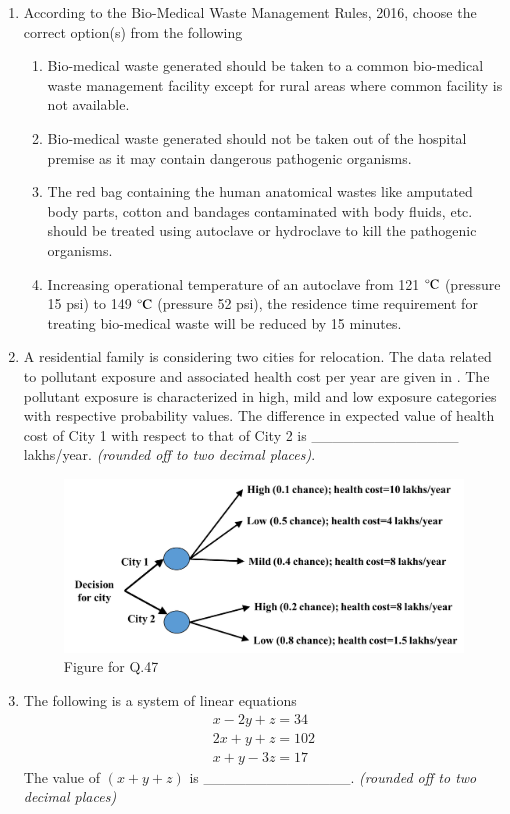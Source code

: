 \documentclass[journal]{IEEEtran}
\begin{document}
\begin{enumerate}[resume]
\item According to the Bio-Medical Waste Management Rules, 2016, choose the correct option(s) from the following
\hfill{}
\begin{enumerate}
\item Bio-medical waste generated should be taken to a common bio-medical waste management facility except for rural areas where common facility is not available.
\item Bio-medical waste generated should not be taken out of the hospital premise as it may contain dangerous pathogenic organisms.
\item The red bag containing the human anatomical wastes like amputated body parts, cotton and bandages contaminated with body fluids, etc. should be treated using autoclave or hydroclave to kill the pathogenic organisms.
\item Increasing operational temperature of an autoclave from 121 $\celsius$ (pressure 15 psi) to 149 $\celsius$ (pressure 52 psi), the residence time requirement for treating bio-medical waste will be reduced by 15 minutes.
\end{enumerate}

\item A residential family is considering two cities for relocation. The data related to pollutant exposure and associated health cost per year are given in . The pollutant exposure is characterized in high, mild and low exposure categories with respective probability values. The difference in expected value of health cost of City 1 with respect to that of City 2 is \_\_\_\_\_\_\_\_\_\_\_\_\_\_ lakhs/year. \textit{(rounded off to two decimal places)}.
\hfill{}
\begin{figure}[H]
    \centering
    \includegraphics[width=0.8\columnwidth]{figs/fig13.png}
    \caption{Figure for Q.47}
    \label{fig13}
\end{figure}

\item The following is a system of linear equations
\begin{align*}
x - 2y + z = 34 \\
2x + y + z = 102 \\
x + y - 3z = 17 
\end{align*}
The value of $(x + y + z)$ is \_\_\_\_\_\_\_\_\_\_\_\_\_\_. \textit{(rounded off to two decimal places)} \hfill{}


\end{enumerate}
\end{document}
